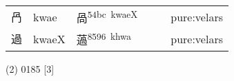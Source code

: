 \documentclass[14pt,a4paper]{scrartcl}
\begin{document}
\begin{longtable}[c]{@{}llllll@{}}
\begin{minipage}[t]{0.14\columnwidth}\raggedright\strut
冎
\strut\end{minipage} &
\begin{minipage}[t]{0.14\columnwidth}\raggedright\strut
kwae
\strut\end{minipage} &
\begin{minipage}[t]{0.14\columnwidth}\raggedright\strut
咼\textsuperscript{54bc~kwaeX}
\strut\end{minipage} &
\begin{minipage}[t]{0.14\columnwidth}\raggedright\strut
\strut\end{minipage} &
\begin{minipage}[t]{0.14\columnwidth}\raggedright\strut
\strut\end{minipage} &
\begin{minipage}[t]{0.14\columnwidth}\raggedright\strut
pure:velars
\strut\end{minipage}\tabularnewline
\begin{minipage}[t]{0.14\columnwidth}\raggedright\strut
過
\strut\end{minipage} &
\begin{minipage}[t]{0.14\columnwidth}\raggedright\strut
kwaeX
\strut\end{minipage} &
\begin{minipage}[t]{0.14\columnwidth}\raggedright\strut
薖\textsuperscript{8596~khwa}
\strut\end{minipage} &
\begin{minipage}[t]{0.14\columnwidth}\raggedright\strut
\strut\end{minipage} &
\begin{minipage}[t]{0.14\columnwidth}\raggedright\strut
\strut\end{minipage} &
\begin{minipage}[t]{0.14\columnwidth}\raggedright\strut
pure:velars
\strut\end{minipage}\tabularnewline
\bottomrule
\end{longtable}

(2) 0185 {[}3{]}
\end{document}

